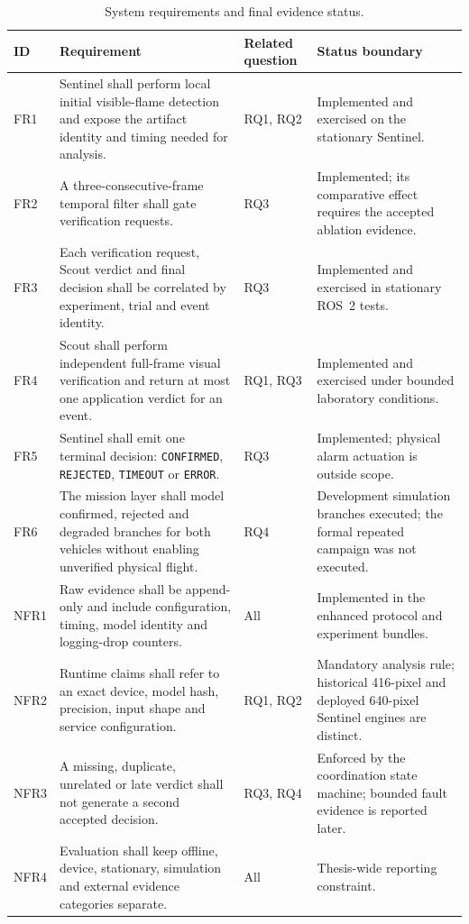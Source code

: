 \begin{table}[H]
  \centering
  \caption{System requirements and final evidence status.}
  \label{tab:requirements}
  \scriptsize
  \begin{tabularx}{\textwidth}{@{}p{}p{}p{}X@{}}
    \toprule
    ID & Requirement & Related question & Status boundary \\
    \midrule
    FR1 & Sentinel shall perform local initial visible-flame detection and
    expose the artifact identity and timing needed for analysis. & RQ1, RQ2 &
    Implemented and exercised on the stationary Sentinel. \\
    FR2 & A three-consecutive-frame temporal filter shall gate verification
    requests. & RQ3 & Implemented; its comparative effect requires the accepted
    ablation evidence. \\
    FR3 & Each verification request, Scout verdict and final decision shall be
    correlated by experiment, trial and event identity. & RQ3 & Implemented and
    exercised in stationary ROS~2 tests. \\
    FR4 & Scout shall perform independent full-frame visual verification and
    return at most one application verdict for an event. & RQ1, RQ3 &
    Implemented and exercised under bounded laboratory conditions. \\
    FR5 & Sentinel shall emit one terminal decision: \texttt{CONFIRMED},
    \texttt{REJECTED}, \texttt{TIMEOUT} or \texttt{ERROR}. & RQ3 & Implemented;
    physical alarm actuation is outside scope. \\
    FR6 & The mission layer shall model confirmed, rejected and degraded
    branches for both vehicles without enabling unverified physical flight. &
    RQ4 & Development simulation branches executed; the formal repeated
    campaign was not executed. \\
    NFR1 & Raw evidence shall be append-only and include configuration, timing,
    model identity and logging-drop counters. & All & Implemented in the enhanced
    protocol and experiment bundles. \\
    NFR2 & Runtime claims shall refer to an exact device, model hash, precision,
    input shape and service configuration. & RQ1, RQ2 & Mandatory analysis rule;
    historical 416-pixel and deployed 640-pixel Sentinel engines are distinct. \\
    NFR3 & A missing, duplicate, unrelated or late verdict shall not generate a
    second accepted decision. & RQ3, RQ4 & Enforced by the coordination state
    machine; bounded fault evidence is reported later. \\
    NFR4 & Evaluation shall keep offline, device, stationary, simulation and
    external evidence categories separate. & All & Thesis-wide reporting
    constraint. \\
    \bottomrule
  \end{tabularx}
\end{table}

